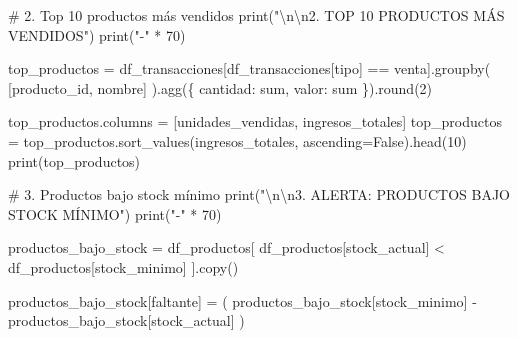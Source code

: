 \documentclass[
  doc,
  floatsintext,
  longtable,
  a4paper,
  nolmodern,
  notxfonts,
  notimes,
  12pt,
  colorlinks=true,linkcolor=blue,citecolor=blue,urlcolor=blue]{apa7}
\newenvironment{Shaded}{\begin{snugshade}}{\end{snugshade}}
\newcommand{\BuiltInTok}[1]{\textcolor[rgb]{0.00,0.23,0.31}{#1}}
\newcommand{\CharTok}[1]{\textcolor[rgb]{0.13,0.47,0.30}{#1}}
\newcommand{\CommentTok}[1]{\textcolor[rgb]{0.37,0.37,0.37}{#1}}
\newcommand{\DecValTok}[1]{\textcolor[rgb]{0.68,0.00,0.00}{#1}}
\newcommand{\NormalTok}[1]{\textcolor[rgb]{0.00,0.23,0.31}{#1}}
\newcommand{\OperatorTok}[1]{\textcolor[rgb]{0.37,0.37,0.37}{#1}}
\newcommand{\StringTok}[1]{\textcolor[rgb]{0.13,0.47,0.30}{#1}}
\newcommand{\VariableTok}[1]{\textcolor[rgb]{0.07,0.07,0.07}{#1}}
\begin{document}
\begin{Shaded}
\begin{Highlighting}[]
\CommentTok{\# 2. Top 10 productos más vendidos}
\BuiltInTok{print}\NormalTok{(}\StringTok{"}\CharTok{\textbackslash{}n\textbackslash{}n}\StringTok{2. TOP 10 PRODUCTOS MÁS VENDIDOS"}\NormalTok{)}
\BuiltInTok{print}\NormalTok{(}\StringTok{"{-}"} \OperatorTok{*} \DecValTok{70}\NormalTok{)}

\NormalTok{top\_productos }\OperatorTok{=}\NormalTok{ df\_transacciones[df\_transacciones[}\StringTok{\textquotesingle{}tipo\textquotesingle{}}\NormalTok{] }\OperatorTok{==} \StringTok{\textquotesingle{}venta\textquotesingle{}}\NormalTok{].groupby(}
\NormalTok{    [}\StringTok{\textquotesingle{}producto\_id\textquotesingle{}}\NormalTok{, }\StringTok{\textquotesingle{}nombre\textquotesingle{}}\NormalTok{]}
\NormalTok{).agg(\{}
    \StringTok{\textquotesingle{}cantidad\textquotesingle{}}\NormalTok{: }\StringTok{\textquotesingle{}sum\textquotesingle{}}\NormalTok{,}
    \StringTok{\textquotesingle{}valor\textquotesingle{}}\NormalTok{: }\StringTok{\textquotesingle{}sum\textquotesingle{}}
\NormalTok{\}).}\BuiltInTok{round}\NormalTok{(}\DecValTok{2}\NormalTok{)}

\NormalTok{top\_productos.columns }\OperatorTok{=}\NormalTok{ [}\StringTok{\textquotesingle{}unidades\_vendidas\textquotesingle{}}\NormalTok{, }\StringTok{\textquotesingle{}ingresos\_totales\textquotesingle{}}\NormalTok{]}
\NormalTok{top\_productos }\OperatorTok{=}\NormalTok{ top\_productos.sort\_values(}\StringTok{\textquotesingle{}ingresos\_totales\textquotesingle{}}\NormalTok{, ascending}\OperatorTok{=}\VariableTok{False}\NormalTok{).head(}\DecValTok{10}\NormalTok{)}
\BuiltInTok{print}\NormalTok{(top\_productos)}

\CommentTok{\# 3. Productos bajo stock mínimo}
\BuiltInTok{print}\NormalTok{(}\StringTok{"}\CharTok{\textbackslash{}n\textbackslash{}n}\StringTok{3. ALERTA: PRODUCTOS BAJO STOCK MÍNIMO"}\NormalTok{)}
\BuiltInTok{print}\NormalTok{(}\StringTok{"{-}"} \OperatorTok{*} \DecValTok{70}\NormalTok{)}

\NormalTok{productos\_bajo\_stock }\OperatorTok{=}\NormalTok{ df\_productos[}
\NormalTok{    df\_productos[}\StringTok{\textquotesingle{}stock\_actual\textquotesingle{}}\NormalTok{] }\OperatorTok{\textless{}}\NormalTok{ df\_productos[}\StringTok{\textquotesingle{}stock\_minimo\textquotesingle{}}\NormalTok{]}
\NormalTok{].copy()}

\NormalTok{productos\_bajo\_stock[}\StringTok{\textquotesingle{}faltante\textquotesingle{}}\NormalTok{] }\OperatorTok{=}\NormalTok{ (}
\NormalTok{    productos\_bajo\_stock[}\StringTok{\textquotesingle{}stock\_minimo\textquotesingle{}}\NormalTok{] }\OperatorTok{{-}}\NormalTok{ productos\_bajo\_stock[}\StringTok{\textquotesingle{}stock\_actual\textquotesingle{}}\NormalTok{]}
\NormalTok{)}


\end{Highlighting}
\end{Shaded}
\end{document}
